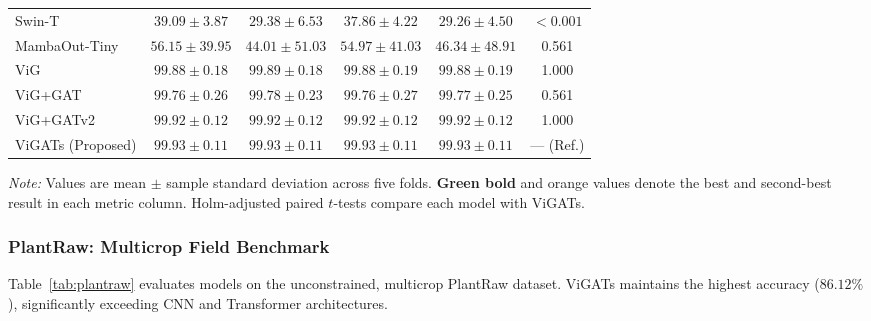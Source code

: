 \documentclass[]{interact}
\theoremstyle{plain}
\theoremstyle{definition}
\theoremstyle{remark}
\newcommand{\bestresult}[1]{\textcolor{bestgreen}{\textbf{#1}}}
\newcommand{\secondresult}[1]{\textcolor{secondorange}{#1}}
\begin{document}
\begin{table}[H]
{\begin{tabular}{lccccc}
Swin-T \citep{liu2021swin} & $39.09 \pm 3.87$ & $29.38 \pm 6.53$ & $37.86 \pm 4.22$ & $29.26 \pm 4.50$ & $< 0.001$ \\
MambaOut-Tiny \citep{yu2024mambaout} & $56.15 \pm 39.95$ & $44.01 \pm 51.03$ & $54.97 \pm 41.03$ & $46.34 \pm 48.91$ & 0.561 \\
ViG \citep{han2022vision} & $99.88 \pm 0.18$ & $99.89 \pm 0.18$ & $99.88 \pm 0.19$ & $99.88 \pm 0.19$ & 1.000 \\
ViG+GAT \citep{velickovic2018graph} & $99.76 \pm 0.26$ & $99.78 \pm 0.23$ & $99.76 \pm 0.27$ & $99.77 \pm 0.25$ & 0.561 \\
ViG+GATv2 \citep{brody2022gat} & \secondresult{$99.92 \pm 0.12$} & \secondresult{$99.92 \pm 0.12$} & \secondresult{$99.92 \pm 0.12$} & \secondresult{$99.92 \pm 0.12$} & 1.000 \\
ViGATs (Proposed) & \bestresult{$99.93 \pm 0.11$} & \bestresult{$99.93 \pm 0.11$} & \bestresult{$99.93 \pm 0.11$} & \bestresult{$99.93 \pm 0.11$} & --- (Ref.) \\
\bottomrule
\end{tabular}}
\label{tab:three_benchmark_datasets}
\parbox{\textwidth}{\vspace{2pt}\footnotesize\textit{Note:} Values are mean $\pm$ sample standard deviation across five folds. \bestresult{Green bold} and \secondresult{orange} values denote the best and second-best result in each metric column. Holm-adjusted paired $t$-tests compare each model with ViGATs.}
\end{table}

\subsubsection{PlantRaw: Multicrop Field Benchmark}
Table~\ref{tab:plantraw} evaluates models on the unconstrained, multicrop PlantRaw dataset. ViGATs maintains the highest accuracy ($86.12\%$), significantly exceeding CNN and Transformer architectures.
\end{document}
